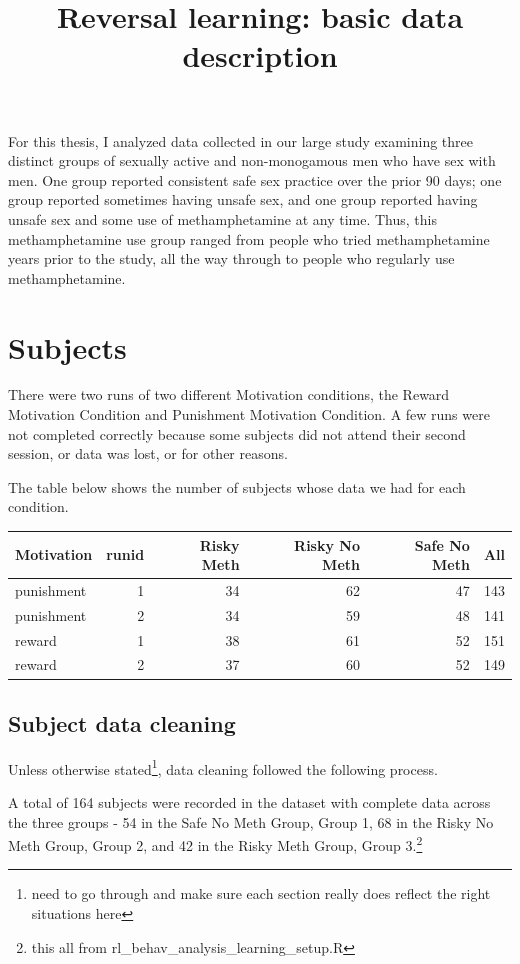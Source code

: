 \documentclass[]{article}
\title{Reversal learning: basic data description}
\author{}
\date{}
\let\rmarkdownfootnote\footnote%
\def\footnote{\protect\rmarkdownfootnote}
\begin{document}
\maketitle

For this thesis, I analyzed data collected in our large study examining
three distinct groups of sexually active and non-monogamous men who have
sex with men. One group reported consistent safe sex practice over the
prior 90 days; one group reported sometimes having unsafe sex, and one
group reported having unsafe sex and some use of methamphetamine at any
time. Thus, this methamphetamine use group ranged from people who tried
methamphetamine years prior to the study, all the way through to people
who regularly use methamphetamine.

\section{Subjects}\label{subjects}

There were two runs of two different Motivation conditions, the Reward
Motivation Condition and Punishment Motivation Condition. A few runs
were not completed correctly because some subjects did not attend their
second session, or data was lost, or for other reasons.

The table below shows the number of subjects whose data we had for each
condition.

\begin{longtable}[]{@{}lrrrrr@{}}
\toprule
Motivation & runid & Risky Meth & Risky No Meth & Safe No Meth &
All\tabularnewline
\midrule
\endhead
punishment & 1 & 34 & 62 & 47 & 143\tabularnewline
punishment & 2 & 34 & 59 & 48 & 141\tabularnewline
reward & 1 & 38 & 61 & 52 & 151\tabularnewline
reward & 2 & 37 & 60 & 52 & 149\tabularnewline
\bottomrule
\end{longtable}

\subsection{Subject data cleaning}\label{subject-data-cleaning}

Unless otherwise
stated\footnote{need to go through and make sure each section really does reflect the right situations here},
data cleaning followed the following process.

A total of 164 subjects were recorded in the dataset with complete data
across the three groups - 54 in the Safe No Meth Group, Group 1, 68 in
the Risky No Meth Group, Group 2, and 42 in the Risky Meth Group, Group
3.\footnote{this all from rl\_behav\_analysis\_learning\_setup.R}
\end{document}

